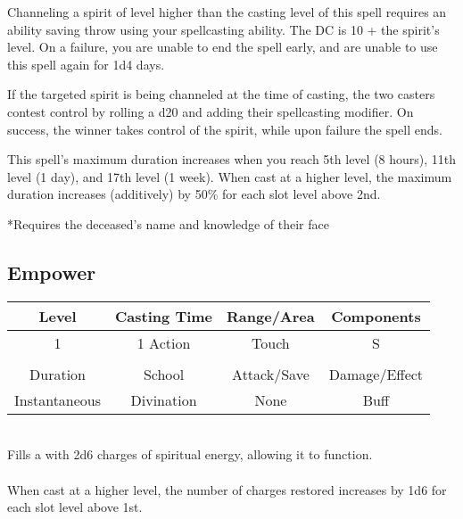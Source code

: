 Channeling a spirit of level higher than the casting level of this spell requires an ability saving throw using your spellcasting ability. The DC is 10 + the spirit's level. On a failure, you are unable to end the spell early, and are unable to use this spell again for 1d4 days.

If the targeted spirit is being channeled at the time of casting, the two casters contest control by rolling a d20 and adding their spellcasting modifier. On success, the winner takes control of the spirit, while upon failure the spell ends.

This spell's maximum duration increases when you reach 5th level (8 hours), 11th level (1 day), and 17th level (1 week). When cast at a higher level, the maximum duration increases (additively) by 50\% for each slot level above 2nd.

*Requires the deceased's name and knowledge of their face


\subsection{Empower}
\label{spells:empower}
\begin{tabular}{c|c|c|c}
Level & Casting Time & Range/Area & Components \\\hline
1 & 1 Action & Touch & S \\
\\
Duration & School & Attack/Save & Damage/Effect \\\hline
Instantaneous & Divination & None & Buff \end{tabular}\\
Fills a  with 2d6 charges of spiritual energy, allowing it to function.\\
\\
When cast at a higher level, the number of charges restored increases by 1d6 for each slot level above 1st. 
